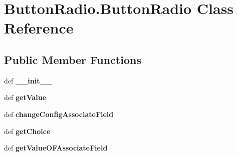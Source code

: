 \hypertarget{classButtonRadio_1_1ButtonRadio}{\section{Button\+Radio.\+Button\+Radio Class Reference}
\label{classButtonRadio_1_1ButtonRadio}
}
\subsection*{Public Member Functions}
\begin{DoxyCompactItemize}
\item 
\hypertarget{classButtonRadio_1_1ButtonRadio_adb7eba7bbe00b3ca43bd4de7424f6bbe}{def {\bfseries \+\_\+\+\_\+init\+\_\+\+\_\+}}\label{classButtonRadio_1_1ButtonRadio_adb7eba7bbe00b3ca43bd4de7424f6bbe}

\item 
\hypertarget{classButtonRadio_1_1ButtonRadio_a24c010e50551a9bc711c25cb039aa444}{def {\bfseries get\+Value}}\label{classButtonRadio_1_1ButtonRadio_a24c010e50551a9bc711c25cb039aa444}

\item 
\hypertarget{classButtonRadio_1_1ButtonRadio_ab1189cfb12e7135ee4fe1394e4637fec}{def {\bfseries change\+Config\+Associate\+Field}}\label{classButtonRadio_1_1ButtonRadio_ab1189cfb12e7135ee4fe1394e4637fec}

\item 
\hypertarget{classButtonRadio_1_1ButtonRadio_ac32284040d2ef137c862c3a24b292f54}{def {\bfseries get\+Choice}}\label{classButtonRadio_1_1ButtonRadio_ac32284040d2ef137c862c3a24b292f54}

\item 
\hypertarget{classButtonRadio_1_1ButtonRadio_a957e9e0ec8abbdebfdb9a40e66e2f827}{def {\bfseries get\+Value\+O\+F\+Associate\+Field}}\label{classButtonRadio_1_1ButtonRadio_a957e9e0ec8abbdebfdb9a40e66e2f827}

\end{DoxyCompactItemize}
